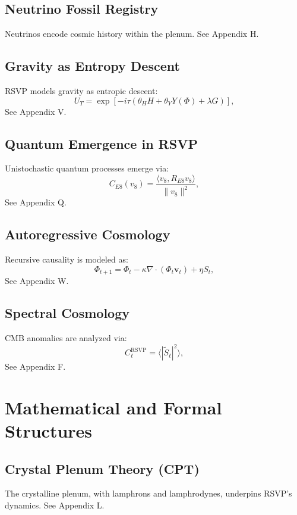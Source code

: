 \documentclass[12pt]{report}
\newcommand{\PhiRSVP}{\Phi}
\newcommand{\vRSVP}{\mathbf{v}}
\newcommand{\SRSVP}{S}
\begin{document}
\chapter{Neutrino Fossil Registry}
Neutrinos encode cosmic history within the plenum. See Appendix H.

\chapter{Gravity as Entropy Descent}
RSVP models gravity as entropic descent:
\begin{equation}
U_T = \exp\left[-i \tau \left(\theta_H H + \theta_Y Y(\PhiRSVP) + \lambda G\right)\right], \label{eq:unified}
\end{equation}
See Appendix V.

\chapter{Quantum Emergence in RSVP}
Unistochastic quantum processes emerge via:
\begin{equation}
C_{E8}(v_8) = \frac{\langle v_8, R_{E8} v_8 \rangle}{\|v_8\|^2}, \label{eq:e8}
\end{equation}
See Appendix Q.

\chapter{Autoregressive Cosmology}
Recursive causality is modeled as:
\begin{equation}
\PhiRSVP_{t+1} = \PhiRSVP_t - \kappa \nabla \cdot (\PhiRSVP_t \vRSVP_t) + \eta \SRSVP_t, \label{eq:autoregressive}
\end{equation}
See Appendix W.

\chapter{Spectral Cosmology}
CMB anomalies are analyzed via:
\begin{equation}
C_\ell^{\text{RSVP}} = \langle |\tilde{\SRSVP}_\ell|^2 \rangle, \label{eq:cmb}
\end{equation}
See Appendix F.

\part{Mathematical and Formal Structures}

\chapter{Crystal Plenum Theory (CPT)}
The crystalline plenum, with lamphrons and lamphrodynes, underpins RSVP’s dynamics. See Appendix L.
\end{document}
